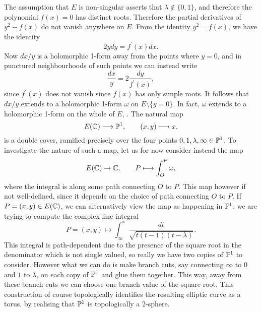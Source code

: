 The assumption that $E$ is non-singular asserts that $\lambda \not\in \{0,1\}$, and therefore the polynomial $f(x) = 0$ has distinct roots. Therefore the partial derivatives of $y^{2} - f(x)$ do not vanish anywhere on $E$. From the identity $y^{2} = f(x)$, we have the identity
\begin{equation*}
	2y dy = f^{\prime}(x)dx.
\end{equation*}
Now $dx/y$ is a holomorphic 1-form away from the points where $y = 0$, and in punctured neighbourhoods of such points we can instead write
\begin{equation*}
	\frac{dx}{y} = 2\frac{dy}{f^{\prime}(x)},
\end{equation*}
since $f^{\prime}(x)$ does not vanish since $f(x)$ has only simple roots. It follows that $dx/y$ extends to a holomorphic 1-form $\omega$ on $E\setminus \{y = 0\}$. In fact, $\omega$ extends to a holomorphic 1-form on the whole of $E$, \cite{Silverman_2009}. The natural map
\begin{equation*}
	E(\mathbb{C}) \longrightarrow \mathbb{P}^{1},\qquad (x,y)\longmapsto x,
\end{equation*}
is a double cover, ramified precisely over the four points $0,1,\lambda,\infty\in\mathbb{P}^{1}$. To investigate the nature of such a map, let us for now consider instead the map
\begin{equation*}
	E(\mathbb{C}) \rightarrow \mathbb{C},\qquad P \longmapsto \int_{O}^{P}\omega,
\end{equation*}
where the integral is along some path connecting $O$ to $P$. This map however if not well-defined, since it depends on the choice of path connecting $O$ to $P$. If $P = (x,y) \in E(\mathbb{C})$, we can alternatively view the map as happening in $\mathbb{P}^{1}$: we are trying to compute the complex line integral
\begin{equation*}
	P = (x,y) \longmapsto \int_{\infty}^{x}\frac{dt}{\sqrt{t(t-1)(t-\lambda)}}.
\end{equation*}
This integral is path-dependent due to the presence of the square root in the denominator which is not single valued, so really we have two copies of $\mathbb{P}^{1}$ to consider. However what we can do is make branch cuts, say connecting $\infty$ to $0$ and $1$ to $\lambda$, on each copy of $\mathbb{P}^{1}$ and glue them together. This way, away from these branch cuts we can choose one branch value of the square root. This construction of course topologically identifies the resulting elliptic curve as a torus, by realising that $\mathbb{P}^{1}$ is topologically a 2-sphere.

